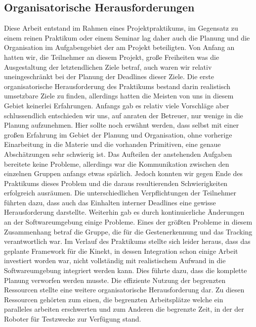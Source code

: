 \subsection{Organisatorische Herausforderungen}
Diese Arbeit entstand im Rahmen eines Projektpraktikums, im Gegensatz
 zu einem reinen Praktikum oder einem Seminar lag daher auch
 die Planung und die Organisation im Aufgabengebiet der am Projekt
 beteiligten. Von Anfang an hatten wir, die Teilnehmer an diesem
 Projekt, große Freiheiten was die Ausgestaltung der letztendlichen
 Ziele betraf, auch waren wir relativ uneingeschränkt bei der Planung
 der Deadlines dieser Ziele. Die erste organisatorische
 Herausforderung des Praktikums bestand darin realistisch umsetzbare
 Ziele zu finden, allerdings hatten die Meisten von uns in diesem
 Gebiet keinerlei Erfahrungen. Anfangs gab es relativ viele Vorschläge
 aber schlussendlich entschieden wir uns, auf anraten der Betreuer,
 nur wenige in die Planung aufzunehmen. Hier sollte noch erwähnt
 werden, dass selbst mit einer großen Erfahrung im Gebiet der
 Planung und Organisation, ohne vorherige Einarbeitung in die Materie
 und die vorhanden Primitiven, eine genaue Abschätzungen sehr
 schwierig ist.
 Das Aufteilen der anstehenden Aufgaben bereitete keine Probleme,
 allerdings war die Kommunikation zwischen den einzelnen Gruppen
 anfangs etwas spärlich. Jedoch konnten wir gegen Ende des
 Praktikums dieses Problem und die daraus resultierenden
 Schwierigkeiten erfolgreich ausräumen. Die unterschiedlichen
 Verpflichtungen der Teilnehmer führten dazu, dass auch das
 Einhalten interner Deadlines eine gewisse Herausforderung
 darstellte. Weiterhin gab es durch kontinuierliche Änderungen
 an der Softwareumgebung einige Probleme. Eines der größten Probleme
 in diesem Zusammenhang betraf die Gruppe, die für die
 Gestenerkennung und das Tracking verantwortlich war.
 Im Verlauf des Praktikums stellte sich leider heraus,
 dass das geplante Framework für die Kinekt, in dessen Integration
 schon einige Arbeit investiert worden war, nicht vollständig
 mit realistischem Aufwand in die Softwareumgebung integriert werden
 kann. Dies führte dazu, dass die komplette Planung verworfen
 werden musste. Die effiziente Nutzung der begrenzten Ressourcen
 stellte eine weitere organisatorische Herausforderung dar.
 Zu diesen Ressourcen gehörten zum einen, die begrenzten Arbeitsplätze
 welche ein paralleles arbeiten erschwerten und zum Anderen die
 begrenzte Zeit, in der der Roboter für Testzwecke zur Verfügung
 stand.

